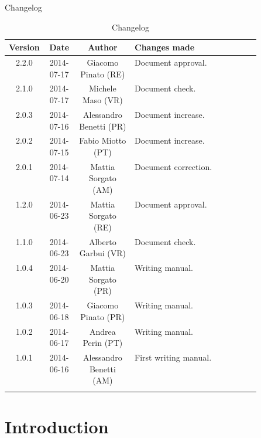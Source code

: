 
\newpage
Changelog
\begin{center}
\begin{longtable}{|c|c|c|p{0.5\linewidth}|}
\toprule
\textbf{Version} & \textbf{Date} & \textbf{Author} & \textbf{Changes made}\\

\midrule
2.2.0 & 2014-07-17 & Giacomo Pinato (RE) & Document approval.\\
\midrule
2.1.0 & 2014-07-17 & Michele Maso (VR) & Document check.\\
\midrule
2.0.3 & 2014-07-16 & Alessandro Benetti (PR) & Document increase.\\
\midrule
2.0.2 & 2014-07-15 & Fabio Miotto (PT) & Document increase.\\
\midrule
2.0.1 & 2014-07-14 & Mattia Sorgato (AM) & Document correction.\\
\midrule
1.2.0 & 2014-06-23 & Mattia Sorgato (RE) & Document approval.\\
\midrule
1.1.0 & 2014-06-23 & Alberto Garbui (VR) & Document check.\\
\midrule
1.0.4 & 2014-06-20 & Mattia Sorgato (PR) & Writing manual.\\
\midrule
1.0.3 & 2014-06-18 & Giacomo Pinato (PR) & Writing manual.\\
\midrule
1.0.2 & 2014-06-17 & Andrea Perin (PT) & Writing manual.\\
\midrule
1.0.1 & 2014-06-16 & Alessandro Benetti (AM) & First writing manual.\\

\bottomrule
\caption{Changelog}
\label{tab:changelog}

\end{longtable}
\end{center}

\newpage
\tableofcontents

\newpage

\newpage
\section{Introduction}
